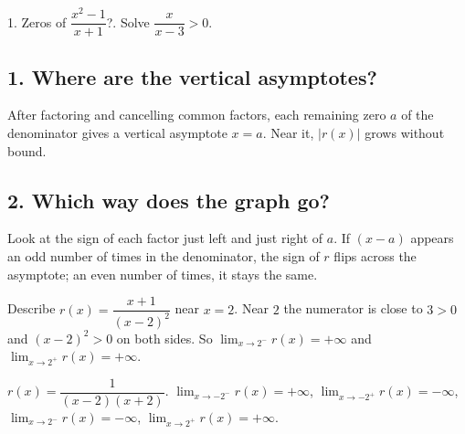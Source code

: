 \begin{quickcheck}
1. Zeros of $\dfrac{x^2-1}{x+1}$?. Solve $\dfrac{x}{x-3}>0$.
\end{quickcheck}


\subsection*{1. Where are the vertical asymptotes?}
\begin{keyidea}
After factoring and cancelling common factors, each remaining zero $a$ of the denominator gives a vertical asymptote $x=a$. Near it, $|r(x)|$ grows without bound.
\end{keyidea}

\subsection*{2. Which way does the graph go?}
Look at the sign of each factor just left and just right of $a$. If $(x-a)$ appears an odd number of times in the denominator, the sign of $r$ flips across the asymptote; an even number of times, it stays the same.

\begin{example}[Example 1]
Describe $r(x)=\dfrac{x+1}{(x-2)^2}$ near $x=2$.
\sol Near $2$ the numerator is close to $3>0$ and $(x-2)^2>0$ on both sides. So $\lim_{x\to2^-}r(x)=+\infty$ and $\lim_{x\to2^+}r(x)=+\infty$.
\end{example}

\begin{example}
\begin{center}
\end{center}
$r(x)=\dfrac{1}{(x-2)(x+2)}$. \sol $\lim_{x\to-2^-}r(x)=+\infty$, $\lim_{x\to-2^+}r(x)=-\infty$, $\lim_{x\to2^-}r(x)=-\infty$, $\lim_{x\to2^+}r(x)=+\infty$.
\end{example}

